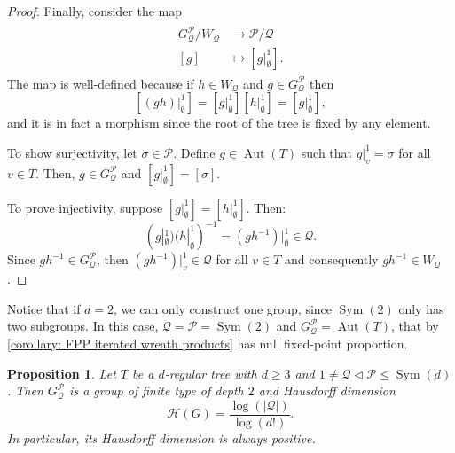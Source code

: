 \documentclass{amsart}
\def\abs#1{\left\vert{#1}\right\vert}
\DeclareMathOperator{\Aut}{Aut}
\DeclareMathOperator{\Sym}{Sym}
\newtheorem{Proposition}{Proposition}[section]
\begin{document}
\begin{proof}
Finally, consider the map 
\begin{align}
\begin{split}
G_\mathcal{Q}^\mathcal{P}/W_\mathcal{Q} & \rightarrow \mathcal{P}/\mathcal{Q} \\ 
[g] & \mapsto [g|_\emptyset^1].
\label{equation: cosets of GQP}
\end{split}
\end{align}
The map is well-defined because if $h \in W_\mathcal{Q}$ and $g \in G_\mathcal{Q}^\mathcal{P}$ then $$[(gh)|_\emptyset^1] = [g|_\emptyset^1] [h|_\emptyset^1] = [g|_\emptyset^1],$$ and it is in fact a morphism since the root of the tree is fixed by any element. 

To show surjectivity, let $\sigma \in \mathcal{P}$.  Define $g \in \Aut(T)$ such that $g|_v^1 = \sigma$ for all $v \in T$. Then, $g \in G_\mathcal{Q}^\mathcal{P}$ and $[g|_\emptyset^1] = [\sigma]$. 

To prove injectivity, suppose $[g|_\emptyset^1] = [h|_\emptyset^1]$. Then: $$(g|_\emptyset^1)(h|_\emptyset^1)^{-1} = (gh^{-1})|_\emptyset^1 \in \mathcal{Q}.$$ Since $gh^{-1} \in G_\mathcal{Q}^\mathcal{P}$, then $(gh^{-1})|_v^1 \in \mathcal{Q}$ for all $v \in T$ and consequently $gh^{-1} \in W_\mathcal{Q}$. 
\end{proof}

Notice that if $d = 2$, we can only construct one group, since $\Sym(2)$ only has two subgroups. In this case, $\mathcal{Q} = \mathcal{P} = \Sym(2)$ and $G_\mathcal{Q}^\mathcal{P} = \Aut(T)$, that by \cref{corollary: FPP iterated wreath products} has null fixed-point proportion.

\begin{Proposition}
Let $T$ be a $d$-regular tree with $d \geq 3$ and $1 \neq \mathcal{Q} \lhd \mathcal{P} \leq \Sym(d)$. Then $G_\mathcal{Q}^\mathcal{P}$ is a group of finite type of depth $2$ and Hausdorff dimension $$\mathcal{H}(G) = \frac{\log(\abs{\mathcal{Q}})}{\log(d!)}.$$ In particular, its Hausdorff dimension is always positive.
\label{proposition: GQP finite type Hausdorff dimension}
\end{Proposition}
\end{document}
